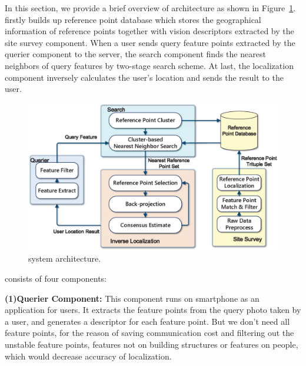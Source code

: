 In this section, we provide a brief overview of \oursystem architecture as shown in Figure~\ref{overview}. \oursystem firstly builds up reference point database which stores the geographical information of reference points together with vision descriptors extracted by the site survey component. When a user sends query feature points extracted by the querier component to the server, the search component finds the nearest neighbors of query features by two-stage search scheme. At last, the localization component inversely calculates the user's location and sends the result to the user.
\begin{figure}[!ht]
\centering
\includegraphics[width=1\linewidth, clip,keepaspectratio]{overview2.eps}
\caption{\oursystem system architecture.}\label{overview}
\end{figure}


\oursystem consists of four components:


\textbf{(1)Querier Component:}
This component runs on smartphone as an application for users. It extracts the feature points from the query photo taken by a user, and generates a descriptor for each feature point. But we don't need all feature points, for the reason of saving communication cost and filtering out the unstable feature points, \ie features not on building structures or features on people, which would decrease accuracy of localization.

